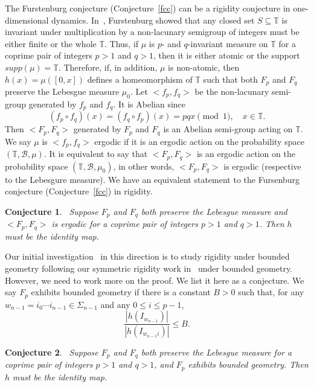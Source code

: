 \documentclass[11pt]{amsart}
\newtheorem{conjecture}{Conjecture}
\theoremstyle{definition}
\begin{document}
The Furstenburg conjecture (Conjecture~\ref{fcc}) can be a rigidity conjecture in one-dimensional dynamics. In~\cite{F}, Furstenburg showed that any closed set $S\subseteq \mathbb{T}$ is invariant under multiplication by a non-lacunary semigroup of integers must be either finite or the whole $\mathbb{T}$. Thus, if $\mu$ is $p$- and $q$-invariant measure on $\mathbb{T}$ for a coprime pair of integers $p>1$ and $q>1$, then it is either atomic or the support $supp (\mu)=\mathbb{T}$.  Therefore, if, in addition,  $\mu$ is non-atomic, then $h(x) =\mu ([0,x])$ defines a homeomorphism of $\mathbb{T}$ such that both $F_{p}$ and $F_{q}$ preserve the Lebesgue measure $\mu_{0}$.  Let $< f_{p}, f_{q}>$ be the non-lacunary semi-group generated by $f_{p}$ and $f_{q}$. It is Abelian since 
$$
(f_{p}\circ f_{q}) (x)=(f_{q}\circ f_{p}) (x) =pq x \pmod{1}, \quad x\in \mathbb{T}. 
$$ 
Then $< F_{p}, F_{q}>$ generated by $F_{p}$ and $F_{q}$ is an Abelian semi-group acting on $\mathbb{T}$. We say $\mu$ is $<f_{p}, f_{q}>$ ergodic if it is an ergodic action on the probability space $(\mathbb{T}, \mathcal{B}, \mu)$. It is equivalent to say that $<F_{p}, F_{q}>$ is an ergodic action on the probability space $(\mathbb{T}, \mathcal{B}, \mu_{0})$, in other words, $<F_{p}, F_{q}>$ is ergodic (respective to the Lebesgure measure). 
We have an equivalent statement to the Fursenburg conjecture (Conjecture~\ref{fcc}) in rigidity. 

\medskip
\begin{conjecture}~\label{fc}
 Suppose $F_{p}$ and $F_{q}$ both preserve the Lebesgue measure and $<F_{p}, F_{q}>$ is ergodic for a coprime pair of integers $p>1$ and $q>1$. Then $h$ must be the identity map.
\end{conjecture}
  
Our initial investigation~\cite{AJ}  in this direction is to study rigidity under bounded geometry following our symmetric rigidity work in~\cite{AHJW} under bounded geometry. However, we need to work more on the proof. We list it here as a conjecture. We say $F_{p}$ exhibits bounded geometry if there is a constant $B>0$ such that, for any $w_{n-1} =i_{0}\cdots i_{n-1}\in \Sigma_{n-1}$ and any $0\leq i\leq p-1$, 
$$
\frac{|h(I_{w_{n-1}})|}{|h(I_{w_{n-1}i})|} \leq B.
$$
 
 \medskip
\begin{conjecture}~\label{rbgc}
 Suppose $F_{p}$ and $F_{q}$ both preserve the Lebesgue measure for a coprime pair of integers $p>1$ and $q>1$, and $F_{p}$ exhibits bounded geometry. Then $h$ must be the identity map.
\end{conjecture}
\end{document}
